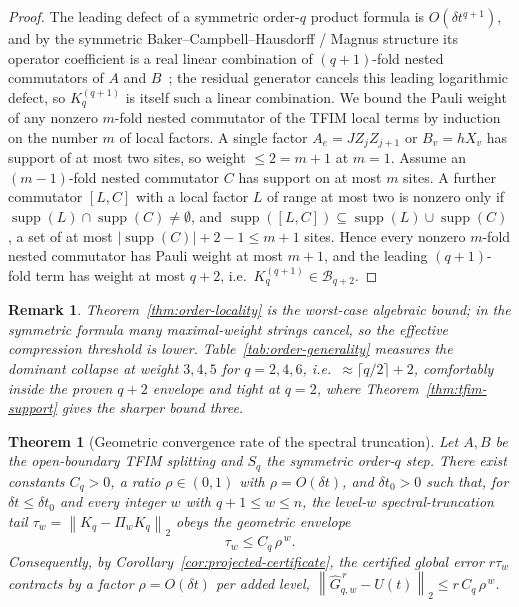 \documentclass[aps,prresearch,reprint,superscriptaddress,nofootinbib,amsmath,amssymb]{revtex4-2}
\newcommand{\tfim}{TFIM}
\newcommand{\norm}[1]{\left\lVert #1 \right\rVert}
\newcommand{\abs}[1]{\left\lvert #1 \right\rvert}
\newcommand{\supp}{\operatorname{supp}}
\newcommand{\cB}{\mathcal{B}}
\newcommand{\dt}{\delta t}
\newtheorem{theorem}{Theorem}
\newtheorem{remark}{Remark}
\begin{document}
\begin{proof}
The leading defect of a symmetric order-$q$ product formula is $O(\dt^{q+1})$, and by the symmetric Baker--Campbell--Hausdorff / Magnus structure its operator coefficient is a real linear combination of $(q{+}1)$-fold nested commutators of $A$ and $B$~\cite{magnus1954,blanes2009}; the residual generator cancels this leading logarithmic defect, so $K_q^{(q+1)}$ is itself such a linear combination. We bound the Pauli weight of any nonzero $m$-fold nested commutator of the \tfim{} local terms by induction on the number $m$ of local factors. A single factor $A_e=JZ_jZ_{j+1}$ or $B_v=hX_v$ has support of at most two sites, so weight $\le2=m+1$ at $m=1$. Assume an $(m{-}1)$-fold nested commutator $C$ has support on at most $m$ sites. A further commutator $[L,C]$ with a local factor $L$ of range at most two is nonzero only if $\supp(L)\cap\supp(C)\neq\emptyset$, and $\supp([L,C])\subseteq\supp(L)\cup\supp(C)$, a set of at most $\abs{\supp(C)}+2-1\le m+1$ sites. Hence every nonzero $m$-fold nested commutator has Pauli weight at most $m+1$, and the leading $(q{+}1)$-fold term has weight at most $q+2$, i.e.\ $K_q^{(q+1)}\in\cB_{q+2}$.
\end{proof}

\begin{remark}
Theorem~\ref{thm:order-locality} is the worst-case algebraic bound; in the symmetric formula many maximal-weight strings cancel, so the \emph{effective} compression threshold is lower. Table~\ref{tab:order-generality} measures the dominant collapse at weight $3,4,5$ for $q=2,4,6$, i.e.\ $\approx\lceil q/2\rceil+2$, comfortably inside the proven $q+2$ envelope and tight at $q=2$, where Theorem~\ref{thm:tfim-support} gives the sharper bound three.
\end{remark}

\begin{theorem}[Geometric convergence rate of the spectral truncation]
\label{thm:spectral-rate}
Let $A,B$ be the open-boundary \tfim{} splitting and $S_q$ the symmetric order-$q$ step. There exist constants $C_q>0$, a ratio $\rho\in(0,1)$ with $\rho=O(\dt)$, and $\dt_0>0$ such that, for $\dt\leq\dt_0$ and every integer $w$ with $q+1\leq w\leq n$, the level-$w$ spectral-truncation tail $\tau_w=\norm{K_q-\Pi_wK_q}_2$ obeys the \emph{geometric envelope}
\begin{equation}
    \tau_w\leq C_q\,\rho^{\,w}.
    \label{eq:spectral-rate}
\end{equation}
Consequently, by Corollary~\ref{cor:projected-certificate}, the certified global error $r\tau_w$ contracts by a factor $\rho=O(\dt)$ per added level, $\norm{\widehat G_{q,w}^{\,r}-U(t)}_2\leq r\,C_q\,\rho^{\,w}$.
\end{theorem}
\end{document}
